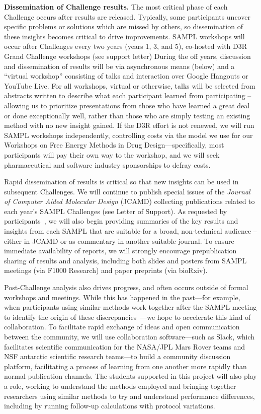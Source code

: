 \documentclass[11pt]{article}
\begin{document}
{\bf Dissemination of Challenge results.}
The most critical phase of each Challenge occurs after results are released. 
Typically, some participants uncover specific problems or solutions which are missed by others, so dissemination of these insights becomes critical to drive improvements.
SAMPL workshops will occur after Challenges every two years (years 1, 3, and 5), co-hosted with D3R Grand Challenge workshops (see support letter)
During the off years, discussion and dissemination of results will be via asynchronous means (below) and a ``virtual workshop'' consisting of talks and interaction over Google Hangouts or YouTube Live.
For all workshops, virtual or otherwise, talks will be selected from abstracts written to describe what each participant learned from participating -- allowing us to prioritize presentations from those who have learned a great deal or done exceptionally well, rather than those who are simply testing an existing method with no new insight gained. 
If the D3R effort is not renewed, we will run SAMPL workshops independently, controlling costs via the model we use for our Workshops on Free Energy Methods in Drug Design---specifically, most participants will pay their own way to the workshop, and we will seek pharmaceutical and software industry sponsorships to defray costs. 

Rapid dissemination of results is critical so that new insights can be used in subsequent Challenges.
We will continue to publish special issues of the \emph{Journal of Computer Aided Molecular Design} (JCAMD) collecting publications related to each year's SAMPL Challenges (see Letter of Support).
As requested by participants~\cite{Mobley:2017:eScholarship}, we will also begin providing summaries of the key results and insights from each SAMPL that are suitable for a broad, non-technical audience -- either in JCAMD or as commentary in another suitable journal.
To ensure immediate availability of reports, we will strongly encourage prepublication sharing of results and analysis, including both slides and posters from SAMPL meetings (via F1000 Research) and paper preprints (via bioRxiv).

Post-Challenge analysis also drives progress, and often occurs outside of formal workshops and meetings.
While this has happened in the past---for example, when participants using similar methods work together after the SAMPL meeting to identify the origin of these discrepancies~\cite{monroe_converging_2014, yin_overview_2016, bhakat_resolving_2016, bosisio_blinded_2016, Mobley:2017:AnnualReviewofBiophysics}---we hope to accelerate this kind of collaboration.
To facilitate rapid exchange of ideas and open communication between the community, we will use collaboration software---such as Slack, which facilitates scientific communication for the NASA/JPL Mars Rover teams and NSF antarctic scientific research teams---to build a community discussion platform, 
facilitating a process of learning from one another more rapidly than normal publication channels. 
The students supported in this project will also play a role, working to understand the methods employed and bringing together researchers using similar methods to try and understand performance differences, including by running follow-up calculations with protocol variations.  
\end{document}
